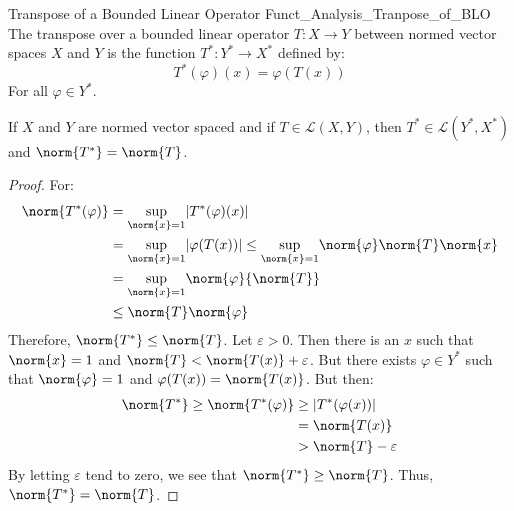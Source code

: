     \begin{ldefinition}{Transpose of a Bounded Linear Operator}
          {Funct_Analysis_Tranpose_of_BLO}
        The transpose over a bounded linear operator
        $T:X\rightarrow{Y}$ between normed vector spaces $X$
        and $Y$ is the function $T^{*}:Y^{*}\rightarrow{X}^{*}$
        defined by:
        \begin{equation}
            T^{*}(\varphi)(x)=\varphi(T(x))
        \end{equation}
        For all $\varphi\in{Y}^{*}$.
    \end{ldefinition}
    \begin{theorem}
        If $X$ and $Y$ are normed vector spaced and if
        $T\in\mathcal{L}(X,Y)$, then
        $T^{*}\in\mathcal{L}(Y^{*},X^{*})$ and
        $\norm{T^{*}}=\norm{T}$.
    \end{theorem}
    \begin{proof}
        For:
        \begin{subequations}
            \begin{align}
                \norm{T^{*}(\varphi)}&=
                \underset{\norm{x}=1}{\sup}|T^{*}(\varphi)(x)|\\
                &=\underset{\norm{x}=1}{\sup}|\varphi(T(x))|\leq
                \underset{\norm{x}=1}{\sup}
                    \norm{\varphi}\norm{T}\norm{x}\\
                &=\underset{\norm{x}=1}{\sup}
                    \norm{\varphi}{\norm{T}}\\
                &\leq\norm{T}\norm{\varphi}
            \end{align}
        \end{subequations}
        Therefore, $\norm{T^{*}}\leq\norm{T}$. Let
        $\varepsilon>0$. Then there is an $x$ such that
        $\norm{x}=1$ and $\norm{T}<\norm{T(x)}+\varepsilon$.
        But there exists $\varphi\in{Y}^{*}$ such that
        $\norm{\varphi}=1$ and $\varphi(T(x))=\norm{T(x)}$.
        But then:
        \begin{subequations}
            \begin{align}
                \norm{T^{*}}\geq\norm{T^{*}(\varphi)}
                &\geq|T^{*}(\varphi(x))|\\
                &=\norm{T(x)}\\
                &>\norm{T}-\varepsilon
            \end{align}
        \end{subequations}
        By letting $\varepsilon$ tend to zero, we see that
        $\norm{T^{*}}\geq\norm{T}$. Thus,
        $\norm{T^{*}}=\norm{T}$.
    \end{proof}

